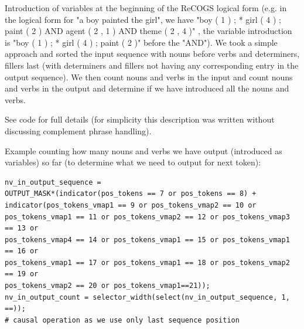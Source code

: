 \documentclass[11pt]{article}
\begin{document}
Introduction of variables at the beginning of the ReCOGS logical form (e.g. in the logical form for "a boy painted the girl", we have "boy ( 1 ) ; * girl ( 4 ) ; paint ( 2 ) AND agent ( 2 , 1 ) AND theme ( 2 , 4 )" , the variable introduction is "boy ( 1 ) ; * girl ( 4 ) ; paint ( 2 )" before the "AND"). We took a simple approach and sorted the input sequence with nouns before verbs and determiners, fillers last (with determiners and fillers not having any corresponding entry in the output sequence). We then count nouns and verbs in the input and count nouns and verbs in the output and determine if we have introduced all the nouns and verbs.

See code for full details (for simplicity this description was written without discussing complement phrase handling).

Example counting how many nouns and verbs we have output (introduced as variables) so far (to determine what we need to output for next token):
\begin{tiny}
\begin{verbatim}
nv_in_output_sequence = 
OUTPUT_MASK*(indicator(pos_tokens == 7 or pos_tokens == 8) + 
indicator(pos_tokens_vmap1 == 9 or pos_tokens_vmap2 == 10 or 
pos_tokens_vmap1 == 11 or pos_tokens_vmap2 == 12 or pos_tokens_vmap3 == 13 or 
pos_tokens_vmap4 == 14 or pos_tokens_vmap1 == 15 or pos_tokens_vmap1 == 16 or 
pos_tokens_vmap1 == 17 or pos_tokens_vmap1 == 18 or pos_tokens_vmap2 == 19 or 
pos_tokens_vmap2 == 20 or pos_tokens_vmap1==21));
nv_in_output_count = selector_width(select(nv_in_output_sequence, 1, ==)); 
# causal operation as we use only last sequence position
\end{verbatim}
\end{tiny}
\end{document}
